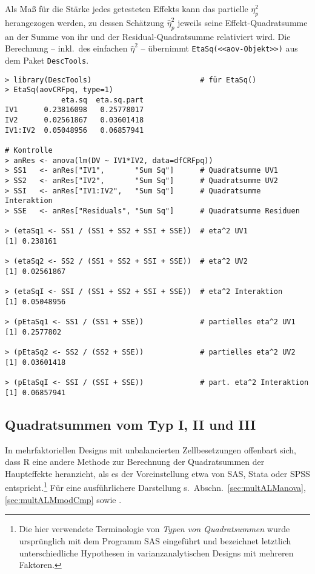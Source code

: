 Als Maß für die Stärke jedes getesteten Effekts kann das partielle $\eta_{p}^{2}$ herangezogen werden, zu dessen Schätzung $\hat{\eta}_{p}^{2}$ jeweils seine Effekt-Quadratsumme an der Summe von ihr und der Residual-Quadratsumme relativiert wird. Die Berechnung -- inkl.\ des einfachen $\hat{\eta}^{2}$ -- übernimmt \lstinline!EtaSq(<<aov-Objekt>>)! aus dem Paket \lstinline!DescTools!.
\begin{lstlisting}
> library(DescTools)                         # für EtaSq()
> EtaSq(aovCRFpq, type=1)
             eta.sq  eta.sq.part
IV1      0.23816098   0.25778017
IV2      0.02561867   0.03601418
IV1:IV2  0.05048956   0.06857941

# Kontrolle
> anRes <- anova(lm(DV ~ IV1*IV2, data=dfCRFpq))
> SS1   <- anRes["IV1",       "Sum Sq"]      # Quadratsumme UV1
> SS2   <- anRes["IV2",       "Sum Sq"]      # Quadratsumme UV2
> SSI   <- anRes["IV1:IV2",   "Sum Sq"]      # Quadratsumme Interaktion
> SSE   <- anRes["Residuals", "Sum Sq"]      # Quadratsumme Residuen

> (etaSq1 <- SS1 / (SS1 + SS2 + SSI + SSE))  # eta^2 UV1
[1] 0.238161

> (etaSq2 <- SS2 / (SS1 + SS2 + SSI + SSE))  # eta^2 UV2
[1] 0.02561867

> (etaSqI <- SSI / (SS1 + SS2 + SSI + SSE))  # eta^2 Interaktion
[1] 0.05048956

> (pEtaSq1 <- SS1 / (SS1 + SSE))             # partielles eta^2 UV1
[1] 0.2577802

> (pEtaSq2 <- SS2 / (SS2 + SSE))             # partielles eta^2 UV2
[1] 0.03601418

> (pEtaSqI <- SSI / (SSI + SSE))             # part. eta^2 Interaktion
[1] 0.06857941
\end{lstlisting}

\subsection{Quadratsummen vom Typ I, II und III}
\label{sec:ssTypes}

In mehrfaktoriellen Designs mit unbalancierten Zellbesetzungen offenbart sich, dass R eine andere Methode zur Berechnung der Quadratsummen der Haupteffekte heranzieht, als es der Voreinstellung etwa von SAS, Stata oder SPSS entspricht.\footnote{Die hier verwendete Terminologie von \emph{Typen von Quadratsummen} wurde ursprünglich mit dem Programm SAS eingeführt und bezeichnet letztlich unterschiedliche Hypothesen in varianzanalytischen Designs mit mehreren Faktoren.} Für eine ausführlichere Darstellung s.\ Abschn.\ \ref{sec:multALManova}, \ref{sec:multALMmodCmp} sowie .

